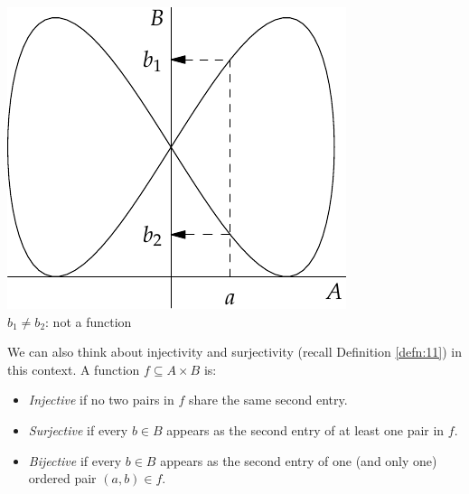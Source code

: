 \begin{center}
\begin{minipage}{0.32\textwidth}
\includegraphics[width=\textwidth]{relations-06-funcvert}\\
$b_1\neq b_2$: not a function
\end{minipage}
\end{center}

\noindent We can also think about injectivity and surjectivity (recall Definition \ref{defn:11}) in this context. A function $f\subseteq A\times B$ is:
\begin{itemize}
  \item \emph{Injective} if no two pairs in $f$ share the same second entry.
  \item \emph{Surjective} if every $b\in B$ appears as the second entry of at least one pair in $f$.
  \item \emph{Bijective} if every $b\in B$ appears as the second entry of one (and only one) ordered pair $(a,b)\in f$.
\end{itemize}


